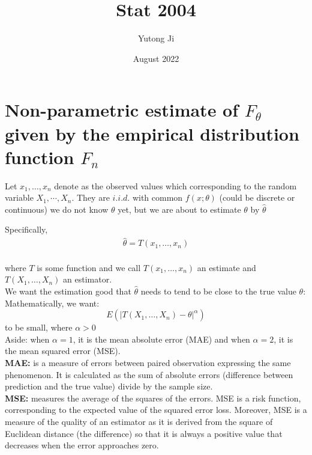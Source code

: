 \documentclass[12pt ]{article}
\title{Stat 2004}
\author{Yutong Ji}
\date{August  2022}
\begin{document}
\maketitle

\section{Non-parametric estimate of $F_{\theta}$ given by the empirical distribution function
$F_{n}$}
\boldmath
Let {$x_{1}, \ldots, x_{n}$} denote as the observed values which corresponding to the random 
variable {$X_{1}, \cdots, X_{n}$}. They are $i.i.d.$ with common $f(x; \theta)$ (could be discrete or continuous)
\unboldmath
\color{blue}
we do not know $\theta$ yet, but we are about to estimate $\theta$ by $\hat{\theta}$ \\

\color{black}

Specifically,
\begin{align*}
\hat{\theta} = T(x_{1}, \ldots, x_{n})
\end{align*}\\
where $T$ is some function and we call $T(x_{1}, \ldots, x_{n})$ an estimate and $T(X_{1}, \ldots, X_{n})$ an estimator. \\

We want the estimation good that $\hat{\theta}$ needs to tend to be close to the true value
$\theta$:\\
Mathematically, we want:
\begin{equation}
E(|T(X_{1}, \ldots, X_{n}) - \theta|^{\alpha})
\end{equation}
to be small, where $\alpha > 0$\\
\color{brown}
Aside: when $\alpha = 1$, it is the mean absolute error (MAE) and when $\alpha = 2$, it is the mean squared error (MSE).\\
\textbf{MAE:} is a measure of errors between paired observation expressing the same phenomenon. It is calculated as the sum of absolute errors (difference between prediction and the true value) divide by the sample size. \\
\textbf{MSE:} measures the average of the squares of the errors. MSE is a risk function, corresponding to the expected value of the squared error loss. Moreover, MSE is a measure of the quality of an estimator as it is derived from the square of Euclidean distance (the difference) so that it is always a positive value that decreases when the error approaches zero. \\ 
\end{document}
